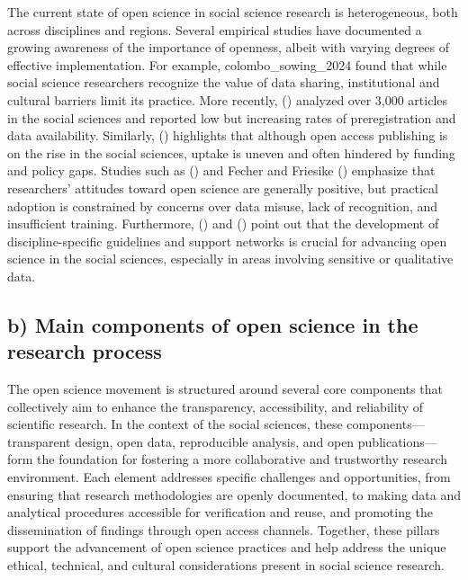 \documentclass[
  letterpaper,
]{article}
\begin{document}
The current state of open science in social science research is
heterogeneous, both across disciplines and regions. Several empirical
studies have documented a growing awareness of the importance of
openness, albeit with varying degrees of effective implementation. For
example, colombo\_sowing\_2024 found that while social science
researchers recognize the value of data sharing, institutional and
cultural barriers limit its practice. More recently,
()
analyzed over 3,000 articles in the social sciences and reported low but
increasing rates of preregistration and data availability. Similarly,
()
highlights that although open access publishing is on the rise in the
social sciences, uptake is uneven and often hindered by funding and
policy gaps. Studies such as
()
and Fecher and Friesike ()
emphasize that researchers' attitudes toward open science are generally
positive, but practical adoption is constrained by concerns over data
misuse, lack of recognition, and insufficient training. Furthermore,
() and
()
point out that the development of discipline-specific guidelines and
support networks is crucial for advancing open science in the social
sciences, especially in areas involving sensitive or qualitative data.

\subsection{b) Main components of open science in the research
process}\label{b-main-components-of-open-science-in-the-research-process}

The open science movement is structured around several core components
that collectively aim to enhance the transparency, accessibility, and
reliability of scientific research. In the context of the social
sciences, these components---transparent design, open data, reproducible
analysis, and open publications---form the foundation for fostering a
more collaborative and trustworthy research environment. Each element
addresses specific challenges and opportunities, from ensuring that
research methodologies are openly documented, to making data and
analytical procedures accessible for verification and reuse, and
promoting the dissemination of findings through open access channels.
Together, these pillars support the advancement of open science
practices and help address the unique ethical, technical, and cultural
considerations present in social science research.
\end{document}
